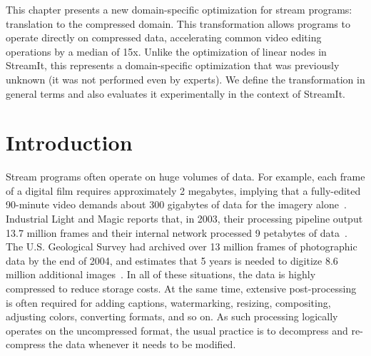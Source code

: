 \newcommand{\x}{\hspace{1.3pt}} %

\label{chap:compression}


This chapter presents a new domain-specific optimization for stream
programs: translation to the compressed domain.  This transformation
allows programs to operate directly on compressed data, accelerating
common video editing operations by a median of 15x.  Unlike the
optimization of linear nodes in StreamIt, this represents a
domain-specific optimization that was previously unknown (it was not
performed even by experts).  We define the transformation in general
terms and also evaluates it experimentally in the context of StreamIt.

\section{Introduction}

Stream programs often operate on huge volumes of data.  For example,
each frame of a digital film requires approximately 2 megabytes,
implying that a fully-edited 90-minute video demands about 300
gigabytes of data for the imagery alone~\cite{ibm-video}.  Industrial
Light and Magic reports that, in 2003, their processing pipeline
output 13.7 million frames and their internal network processed 9
petabytes of data~\cite{ilm-interview}.  The U.S. Geological Survey
had archived over 13 million frames of photographic data by the end of
2004, and estimates that 5 years is needed to digitize 8.6 million
additional images~\cite{usgs}.  In all of these situations, the data
is highly compressed to reduce storage costs.  At the same time,
extensive post-processing is often required for adding captions,
watermarking, resizing, compositing, adjusting colors, converting
formats, and so on.  As such processing logically operates on the
uncompressed format, the usual practice is to decompress and
re-compress the data whenever it needs to be modified.

